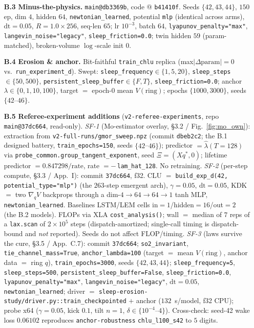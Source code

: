 \documentclass[10pt]{article}
\begin{document}
\textbf{B.3 Minus-the-physics.} \texttt{main@db3369b}, code @ \texttt{b41410f}. Seeds $\{42,43,44\}$, $150$ ep, dim $4$, hidden $64$, \texttt{newtonian\_learned}, potential \texttt{mlp} (identical across arms), $\mathrm{dt}{=}0.05$, $R{=}1.0{\times}256$, seq-len $65$; lr $10^{-3}$, batch $64$, \texttt{lyapunov\_penalty="max"}, \texttt{langevin\_noise="legacy"}, \texttt{sleep\_friction=0.0}; twin hidden $59$ (param-matched), broken-volume $\log$-scale init $0$.

\textbf{B.4 Erosion \& anchor.} Bit-faithful \texttt{train\_chlu} replica (max$|\Delta\text{param}|{=}0$ vs.\ \texttt{run\_experiment\_d}). Swept: \texttt{sleep\_frequency}$\in\{1,5,20\}$, \texttt{sleep\_steps}$\in\{50,500\}$, \texttt{persistent\_sleep\_buffer}$\in\{F,T\}$, \texttt{sleep\_friction=0.0}; anchor $\lambda\in\{0,1,10,100\}$, target $=$ epoch-0 mean $V(\text{ring})$; epochs $\{1000,3000\}$, seeds $\{42$--$46\}$.

\textbf{B.5 Referee-experiment additions} (\texttt{v2-referee-experiments}, repo \texttt{main@37dc664}, read-only). \emph{SF-1} (Mo-estimator overlay, \S3.2 / Fig.~\ref{fig:mo_own}): extraction from \texttt{v2-full-runs/gmor\_sweep.npz} (commit \texttt{dbeb2c2}; the B.1 designed battery, \texttt{train\_epochs=150}, seeds $\{42$--$46\}$); predictor $=\hat\lambda(T{=}128)$ via \texttt{probe\_common.group\_tangent\_exponent}, seed $\Xi=(Xq^*,0)$; lifetime predictor $=0.847298/\text{rate}$, rate $=-\,$\texttt{lam\_hat\_128}. No retraining. \emph{SF-2} (per-step compute, \S3.3 / App.~I): commit \texttt{37dc664}, f32. CLU $=$ \texttt{build\_exp\_d(42, potential\_type="mlp")} (the $263$-step emergent arch), $\gamma{=}0.05$, $\mathrm{dt}{=}0.05$, KDK $=$ two $\nabla_qV$ backprops through a dim-$4{\to}64{\to}64{\to}1$ tanh MLP, \texttt{newtonian\_learned}. Baselines LSTM/LEM cells in$=1$/hidden$=16$/out$=2$ (the B.2 models). FLOPs via XLA \texttt{cost\_analysis()}; wall $=$ median of $7$ reps of a \texttt{lax.scan} of $2{\times}10^5$ steps (dispatch-amortized; single-call timing is dispatch-bound and \emph{not} reported). Seeds do not affect FLOP/timing. \emph{SF-3} (laws survive the cure, \S3.5 / App.~C.7): commit \texttt{37dc664}; \texttt{so2\_invariant}, \texttt{tie\_channel\_mass=True}, \texttt{anchor\_lambda=100} (target $=$ mean $V(\text{ring})$, anchor data $=$ ring $q$), \texttt{train\_epochs=3000}, seeds $\{42,43,44\}$; \texttt{sleep\_frequency=5}, \texttt{sleep\_steps=500}, \texttt{persistent\_sleep\_buffer=False}, \texttt{sleep\_friction=0.0}, \texttt{lyapunov\_penalty="max"}, \texttt{langevin\_noise="legacy"}, $\mathrm{dt}{=}0.05$, \texttt{newtonian\_learned}; driver $=$ \texttt{sleep-erosion-study/driver.py::train\_checkpointed} $+$ anchor ($132$~s/model, f32 CPU); probe x64 ($\gamma{=}0.05$, kick $0.1$, tilt $n{=}1$, $\delta\in\{10^{-4}$--$4\}$). Cross-check: seed-42 wake loss $0.06102$ reproduces \texttt{anchor-robustness} \texttt{chlu\_l100\_s42} to $5$ digits.
\end{document}

